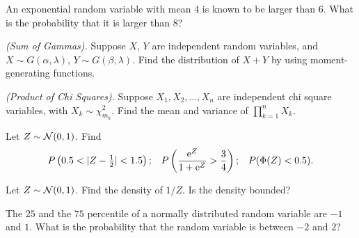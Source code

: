 \begin{problem}[Handout 13, \# 17]
  An exponential random variable with mean \(4\) is known to be larger than
  \(6\). What is the probability that it is larger than \(8\)?
\end{problem}
\begin{solution*}

\end{solution*}

\begin{problem}[Handout 13, \# 18]
  \emph{(Sum of Gammas).} Suppose \(X\), \(Y\) are independent random
  variables, and \(X\sim G(\alpha,\lambda)\), \(Y\sim
  G(\beta,\lambda)\). Find the distribution of \(X+Y\) by using
  moment-generating functions.
\end{problem}
\begin{solution*}

\end{solution*}

\begin{problem}[Handout 13, \# 19]
  \emph{(Product of Chi Squares).} Suppose \(X_1,X_2,\dotsc,X_n\) are
  independent chi square variables, with \(X_k\sim\chi_{m_k}^2\). Find the
  mean and variance of \(\prod_{k=1}^n X_k\).
\end{problem}
\begin{solution*}

\end{solution*}

\begin{problem}[Handout 13, \# 20]
  Let \(Z\sim \mathcal{N}(0,1)\). Find
  \[
    \begin{aligned}
      P\left( 0.5<|Z-\tfrac{1}{2}|<1.5\right);
      && P\left(\frac{\rme^Z}{1+\rme^Z}>\frac{3}{4}\right);
      &&P(\Phi(Z)<0.5).
    \end{aligned}
  \]
\end{problem}
\begin{solution*}

\end{solution*}

\begin{problem}[Handout 13, \# 21]
  Let \(Z\sim\mathcal{N}(0,1)\). Find the density of \(1/Z\). Is the
  density bounded?
\end{problem}
\begin{solution*}

\end{solution*}

\begin{problem}[Handout 13, \# 22]
  The \(25\) and the \(75\) percentile of a
  normally distributed random variable are \(-1\) and \(1\). What is the
  probability that the random variable is between \(-2\) and \(2\)?
\end{problem}
\begin{solution*}

\end{solution*}

